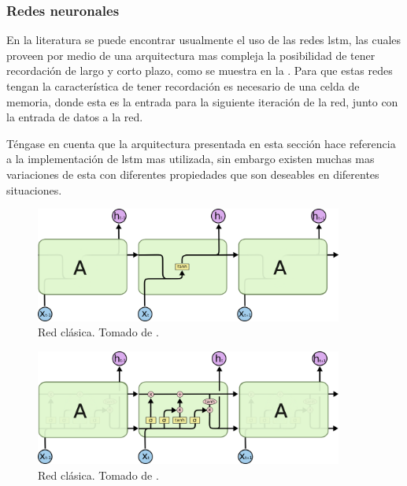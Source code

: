 \subsubsection{Redes neuronales }
En la literatura se puede encontrar usualmente el uso de las redes \gls{lstm}, las cuales proveen por medio de una arquitectura mas compleja la posibilidad de tener recordación de largo y corto plazo, como se muestra en la . Para que estas redes tengan la característica de tener recordación es necesario de una celda de memoria, donde esta es la entrada para la siguiente iteración de la red, junto con la entrada de datos a la red.

Téngase en cuenta que la arquitectura presentada en esta sección hace referencia a la implementación de \gls{lstm} mas utilizada, sin embargo existen muchas mas variaciones de esta con diferentes propiedades que son deseables en diferentes situaciones.
\begin{figure}[H]
  \centering
  \includegraphics[width=0.9\textwidth]{Figures/LSTM3-SimpleRNN.png}
\decoRule
\caption[Red  clásica]{Red  clásica. Tomado de \cite{understanding-lstm}.}
\label{fig:rnn-classic}
\end{figure}

\begin{figure}[H]
  \centering
  \includegraphics[width=0.9\textwidth]{Figures/LSTM3-chain.png}
\decoRule
\caption[Red  clásica]{Red  clásica. Tomado de \cite{understanding-lstm}.}
\label{fig:lstm-classic}
\end{figure}

